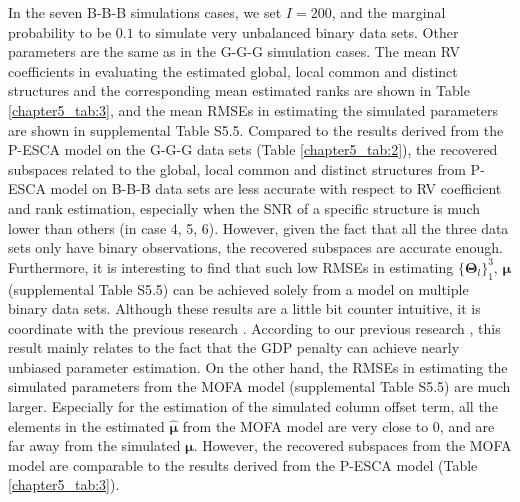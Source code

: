 In the seven B-B-B simulations cases, we set $I=200$, and the marginal probability to be $0.1$ to simulate very unbalanced binary data sets. Other parameters are the same as in the G-G-G simulation cases. The mean RV coefficients in evaluating the estimated global, local common and distinct structures and the corresponding mean estimated ranks are shown in Table \ref{chapter5_tab:3}, and the mean RMSEs in estimating the simulated parameters are shown in supplemental Table S5.5. Compared to the results derived from the P-ESCA model on the G-G-G data sets (Table \ref{chapter5_tab:2}), the recovered subspaces related to the global, local common and distinct structures from P-ESCA model on B-B-B data sets are less accurate with respect to RV coefficient and rank estimation, especially when the SNR of a specific structure is much lower than others (in case 4, 5, 6). However, given the fact that all the three data sets only have binary observations, the recovered subspaces are accurate enough. Furthermore, it is interesting to find that such low RMSEs in estimating $\{ \mathbf{\Theta}_l \}_1^{3} $, $\bm{\mu}$ (supplemental Table S5.5) can be achieved solely from a model on multiple binary data sets. Although these results are a little bit counter intuitive, it is coordinate with the previous research \cite{davenport20141,song2018generalized}. According to our previous research \cite{song2018generalized}, this result mainly relates to the fact that the GDP penalty can achieve nearly unbiased parameter estimation. On the other hand, the RMSEs in estimating the simulated parameters from the MOFA model (supplemental Table S5.5) are much larger. Especially for the estimation of the simulated column offset term, all the elements in the estimated $\hat{\bm{\mu}}$ from the MOFA model are very close to 0, and are far away from the simulated $\bm{\mu}$. However, the recovered subspaces from the MOFA model are comparable to the results derived from the P-ESCA model (Table \ref{chapter5_tab:3}).

